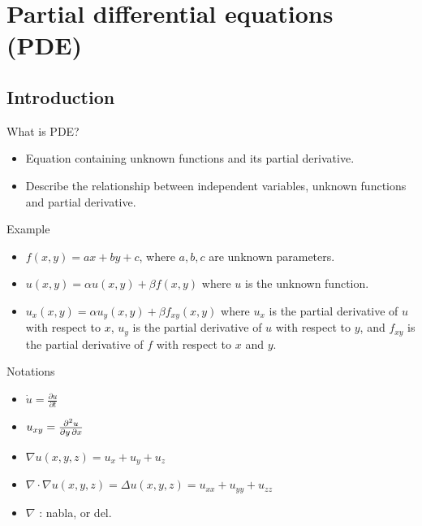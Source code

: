 \documentclass[aspectratio=1610,xcolor={dvipsnames},hyperref={colorlinks,unicode,linkcolor=violet,anchorcolor=BlueViolet,citecolor=YellowOrange,filecolor=black,urlcolor=Aquamarine}]{beamer}
\begin{document}
\section{Partial differential equations (PDE)}
\label{sec:orgbe4fdbf}

\subsection{Introduction}
\label{sec:orgf44bd95}

\begin{frame}[label={sec:orga911dd7}]{What is PDE?}
\begin{itemize}
\item Equation containing \alert{unknown functions} and \alert{its partial derivative}.
\item Describe the relationship between independent variables, unknown functions and partial derivative.
\end{itemize}

\begin{exampleblock}{Example}
\begin{itemize}
\item \(f(x, y) = ax + by + c\), where \(a, b, c\) are unknown parameters.
\item \(u(x, y) = \alpha u(x, y) + \beta f(x, y)\) where \(u\) is the unknown function.
\item \(u_{x}(x, y) = \alpha u_{y}(x, y) + \beta f_{xy}(x, y)\) where \(u_{x}\) is the partial derivative of \(u\) with respect to \(x\), \(u_{y}\) is the partial derivative of \(u\) with respect to \(y\), and \(f_{xy}\) is the partial derivative of \(f\) with respect to \(x\) and \(y\).
\end{itemize}
\end{exampleblock}
\end{frame}

\begin{frame}[label={sec:orgbbe65b8}]{Notations}
\begin{itemize}
\item \(\dot{u} = \frac{\partial{u}}{\partial{t}}\)
\item \(u_{xy} = {\partial ^{2}u \over \partial y\,\partial x}\)
\item \(\nabla u (x, y, z) = u_{x} + u_{y} + u_{z}\)
\item \(\nabla \cdot \nabla u(x, y, z) = \Delta u(x,y,z) = u_{xx} + u_{yy} + u_{zz}\)
\item \(\nabla\) : nabla, or del.
\end{itemize}
\end{frame}
\end{document}
